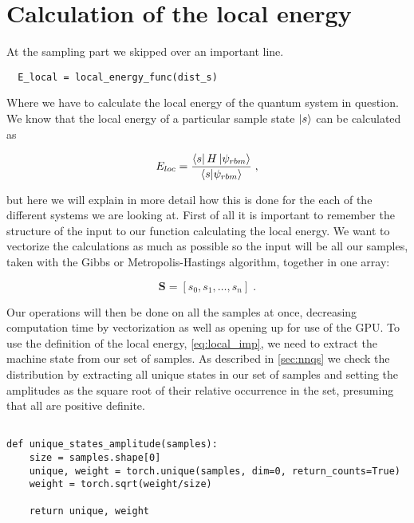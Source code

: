 \section{Calculation of the local energy}

At the sampling part we skipped over an important line.

\begin{verbatim}
  E_local = local_energy_func(dist_s)
\end{verbatim}

Where we have to calculate the local energy of the quantum system in question. We know that the local energy of a particular sample state $\ket{s}$ can be calculated as

\begin{equation}
  E_{loc} = \displaystyle\frac{\bra{s}H\ket{\psi_{rbm}}}{\braket{s}{\psi_{rbm}}} \; ,
  \label{eq:local_imp}
\end{equation}

but here we will explain in more detail how this is done for the each of the different systems we are looking at. First of all it is important to remember the structure of the input to our function calculating the local energy. We want to vectorize the calculations as much as possible so the input will be all our samples, taken with the Gibbs or Metropolis-Hastings algorithm, together in one array:

\begin{equation}
  \mathbf{S} = \left [ s_0, s_1, \dots, s_n \right] \; .
  \label{eq:Samples_set}
\end{equation}

Our operations will then be done on all the samples at once, decreasing computation time by vectorization as well as opening up for use of the GPU. To use the definition of the local energy, \ref{eq:local_imp}, we need to extract the machine state from our set of samples. As described in \ref{sec:nnqs} we check the distribution by extracting all unique states in our set of samples and setting the amplitudes as the square root of their relative occurrence in the set, presuming that all are positive definite.

\begin{verbatim}
  
def unique_states_amplitude(samples):
    size = samples.shape[0]
    unique, weight = torch.unique(samples, dim=0, return_counts=True)
    weight = torch.sqrt(weight/size)

    return unique, weight
\end{verbatim}

